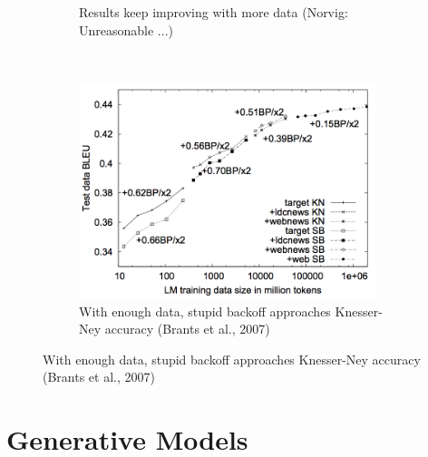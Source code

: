 \documentclass[11pt,letterpaper]{article}
\begin{document}
\begin{itemize}
\begin{figure}[h]
\begin{subfigure}[b]{0.3\textwidth}
                \caption{Results keep improving with more data (Norvig: Unreasonable ...)}
        \end{subfigure}
        ~~~
        \begin{subfigure}[b]{0.3\textwidth}
                \includegraphics[width=0.95\textwidth]{stupid-backoff.png}
                \caption{With enough data, stupid backoff approaches Knesser-Ney accuracy  (Brants et al., 2007)}
        \end{subfigure}
      \end{figure}
      \vspace{-6mm}
\end{itemize}





\section{Generative Models}
\end{document}
